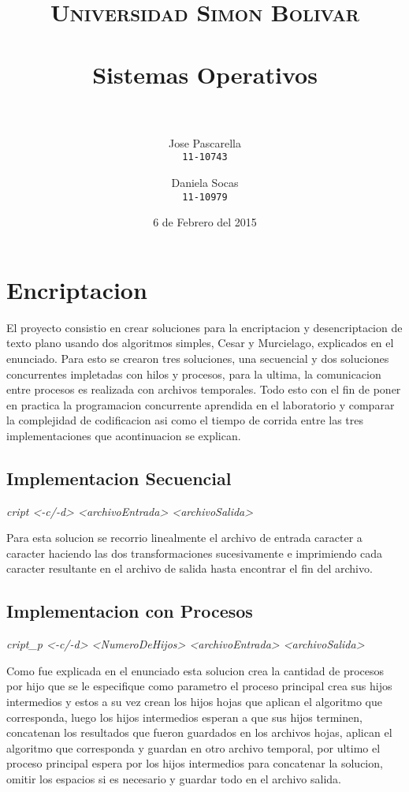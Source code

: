 \documentclass[paper=a4, fontsize=11pt]{scrartcl} %
\title{	
\normalfont \normalsize 
\textsc{Universidad Simon Bolivar} \\ [25pt] %
\horrule{0.5pt} \\[0.4cm] %
\huge Sistemas Operativos \\ %
\horrule{2pt} \\[0.5cm] %
}
\author{
  Jose Pascarella\\
  \texttt{11-10743}
  \and
  Daniela Socas\\
  \texttt{11-10979}
}
\date{6 de Febrero del 2015} %
\begin{document}
\maketitle %


\section{Encriptacion}

El proyecto consistio en crear soluciones para la encriptacion y desencriptacion de texto plano usando dos algoritmos simples, Cesar y Murcielago, explicados en el enunciado. Para esto se crearon tres soluciones, una secuencial y dos soluciones concurrentes impletadas con hilos y procesos, para la ultima, la comunicacion entre procesos es realizada con archivos temporales. Todo esto con el fin de poner en practica la programacion concurrente aprendida en el laboratorio y comparar la complejidad de codificacion asi como el tiempo de corrida entre las tres implementaciones que acontinuacion se explican.



\subsection{Implementacion Secuencial}

\emph{cript <-c/-d> <archivoEntrada> <archivoSalida>}




Para esta solucion se recorrio linealmente el archivo de entrada caracter a caracter haciendo las dos transformaciones sucesivamente e imprimiendo cada caracter resultante en el archivo de salida hasta encontrar el fin del archivo.

\subsection{Implementacion con Procesos}

\emph{cript\_p <-c/-d> <NumeroDeHijos> <archivoEntrada> <archivoSalida>}

Como fue explicada en el enunciado esta solucion crea la cantidad de procesos por hijo que se le especifique como parametro el proceso principal crea sus hijos intermedios y estos a su vez crean los hijos hojas que aplican el algoritmo que corresponda, luego los hijos intermedios esperan a que sus hijos terminen, concatenan los resultados que fueron guardados en los archivos hojas, aplican el algoritmo que corresponda y guardan en otro archivo temporal, por ultimo el proceso principal espera por los hijos intermedios para concatenar la solucion, omitir los espacios si es necesario y guardar todo en el archivo salida.
\end{document}
